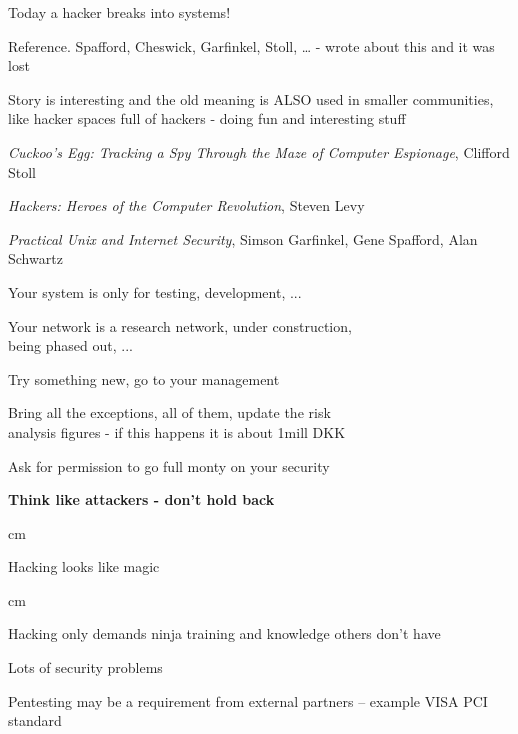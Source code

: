 \documentclass[Screen16to9,17pt]{foils}
\begin{document}
{\color{red}\hlkbig Today a hacker breaks into systems!}

Reference. Spafford, Cheswick, Garfinkel, Stoll, \ldots
- wrote about this and it was lost

Story is interesting and the old meaning is ALSO used in smaller communities, like hacker spaces full of hackers - doing fun and interesting stuff
\begin{list2}
\item \emph{Cuckoo's Egg: Tracking a Spy Through the Maze of Computer
 Espionage},  Clifford Stoll
\item \emph{Hackers: Heroes of the Computer Revolution},
Steven Levy
\item \emph{Practical Unix and Internet Security},
Simson Garfinkel, Gene Spafford, Alan Schwartz
\end{list2}



Your system is only for testing, development, ...

Your network is a research network, under construction, \\
being phased out, ...

Try something new, go to your management

Bring all the exceptions, all of them, update the risk \\
analysis figures - if this happens it is about 1mill DKK

Ask for permission to go full monty on your security

{\bf Think like attackers - don't hold back}





 cm

Hacking looks like magic



 cm
\centerline{Hacking only demands ninja training and knowledge others don't have}


\begin{list1}
\item Lots of security problems
\item Pentesting may be a requirement from external partners -- example VISA PCI standard
\end{list1}
\end{document}
